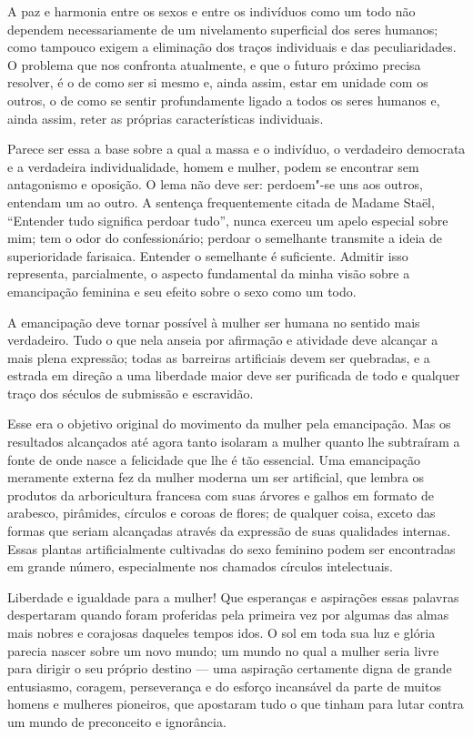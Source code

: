 A paz e harmonia entre os sexos e entre os indivíduos como um todo não
dependem necessariamente de um nivelamento superficial dos seres\label{ref6}
humanos; como tampouco exigem a eliminação dos traços individuais e das
peculiaridades. O problema que nos confronta atualmente, e que o futuro
próximo precisa resolver, é o de como ser si mesmo e, ainda assim, estar
em unidade com os outros, o de como se sentir profundamente ligado a
todos os seres humanos e, ainda assim, reter as próprias características
individuais.

Parece ser essa a base sobre a qual a massa e o indivíduo, o
verdadeiro democrata e a verdadeira individualidade, homem e mulher, podem se
encontrar sem antagonismo e oposição. O lema não deve ser: perdoem"-se
uns aos outros, entendam um ao outro. A sentença frequentemente citada
de Madame Staël, ``Entender tudo significa perdoar tudo'', nunca exerceu
um apelo especial sobre mim; tem o odor do confessionário; perdoar o
semelhante transmite a ideia de superioridade farisaica. Entender o
semelhante é suficiente. Admitir isso representa,
parcialmente, o aspecto fundamental da minha visão sobre a emancipação feminina
e seu efeito sobre o sexo como um todo.

A emancipação deve tornar possível à mulher ser humana no sentido mais
verdadeiro. Tudo o que nela anseia por afirmação e atividade deve
alcançar a mais plena expressão; todas as barreiras artificiais devem
ser quebradas, e a estrada em direção a uma liberdade maior deve ser
purificada de todo e qualquer traço dos séculos de submissão e
escravidão.

Esse era o objetivo original do movimento da mulher pela emancipação.
Mas os resultados alcançados até agora tanto isolaram a mulher quanto
lhe subtraíram a fonte de onde nasce a felicidade que lhe é tão essencial.
Uma emancipação meramente externa fez da mulher moderna um ser
artificial, que lembra os produtos da arboricultura francesa com suas
árvores e galhos em formato de arabesco, pirâmides, círculos e coroas de
flores; de qualquer coisa, exceto das formas que seriam alcançadas
através da expressão de suas qualidades internas. Essas plantas
artificialmente cultivadas do sexo feminino podem ser encontradas em
grande número, especialmente nos chamados círculos intelectuais. 

Liberdade e igualdade para a mulher! Que esperanças e aspirações essas
palavras despertaram quando foram proferidas pela primeira vez por
algumas das almas mais nobres e corajosas daqueles tempos idos. O sol em
toda sua luz e glória parecia nascer sobre um novo mundo; um mundo no
qual a mulher seria livre para dirigir o seu próprio destino --- uma
aspiração certamente digna de grande entusiasmo, coragem, perseverança e
do esforço incansável da parte de muitos homens e mulheres pioneiros,
que apostaram tudo o que tinham para lutar contra um mundo de
preconceito e ignorância.

